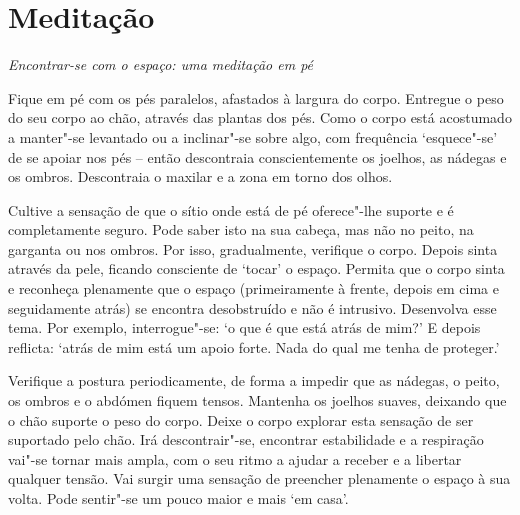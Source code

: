 \clearpage

\section[Meditação: encontrar-se com o espaço]{Meditação}

{\centering
\subSectionFont\selectfont
\textit{Encontrar-se com o espaço: uma meditação em pé}
\par}

\bigskip

Fique em pé com os pés paralelos, afastados à largura do corpo. Entregue o peso
do seu corpo ao chão, através das plantas dos pés. Como o corpo está acostumado
a manter"-se levantado ou a inclinar"-se sobre algo, com frequência
`esquece"-se' de se apoiar nos pés -- então descontraia conscientemente os
joelhos, as nádegas e os ombros. Descontraia o maxilar e a zona em torno dos
olhos.

Cultive a sensação de que o sítio onde está de pé oferece"-lhe suporte e é
completamente seguro. Pode saber isto na sua cabeça, mas não no peito, na
garganta ou nos ombros. Por isso, gradualmente, verifique o corpo. Depois sinta
através da pele, ficando consciente de `tocar' o espaço. Permita que o corpo
sinta e reconheça plenamente que o espaço (primeiramente à frente, depois em
cima e seguidamente atrás) se encontra desobstruído e não é intrusivo.
Desenvolva esse tema. Por exemplo, interrogue"-se: `o que é que está atrás de
mim?' E depois reflicta: `atrás de mim está um apoio forte. Nada do qual me
tenha de proteger.'

Verifique a postura periodicamente, de forma a impedir que as nádegas, o peito,
os ombros e o abdómen fiquem tensos. Mantenha os joelhos suaves, deixando que o
chão suporte o peso do corpo. Deixe o corpo explorar esta sensação de ser
suportado pelo chão. Irá descontrair"-se, encontrar estabilidade e a respiração
vai"-se tornar mais ampla, com o seu ritmo a ajudar a receber e a libertar
qualquer tensão. Vai surgir uma sensação de preencher plenamente o espaço à sua
volta. Pode sentir"-se um pouco maior e mais `em casa'.

